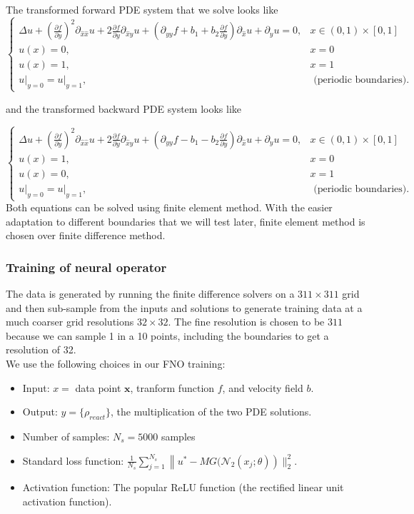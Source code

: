 \documentclass{article}
\begin{document}
The transformed forward PDE system that we solve looks like
$$
\begin{cases}\Delta u+\left(\frac{\partial f}{\partial y}\right)^2 \partial_{\hat{x} \hat{x}} u+2 \frac{\partial f}{\partial y} \partial_{\hat{x} y} u+\left(\partial_{y y} f+b_1+b_2 \frac{\partial f}{\partial y}\right) \partial_{\hat{x}} u+\partial_y u=0, & x \in(0,1) \times[0,1] \\ u(x)=0, & x=0 \\ u(x)=1, & x=1 \\ \left.u\right|_{y=0}=\left.u\right|_{y=1}, & \text { (periodic boundaries). }\end{cases}
$$

and the transformed backward PDE system looks like

$\begin{cases}\Delta u+\left(\frac{\partial f}{\partial y}\right)^2 \partial_{\hat{x} \hat{x}} u+2 \frac{\partial f}{\partial y} \partial_{\hat{x} y} u+\left(\partial_{y y} f-b_1-b_2 \frac{\partial f}{\partial y}\right) \partial_{\hat{x}} u+\partial_y u=0, & x \in(0,1) \times[0,1] \\ u(x)=1, & x=0 \\ u(x)=0, & x=1 \\ \left.u\right|_{y=0}=\left.u\right|_{y=1}, & \text { (periodic boundaries). }\end{cases}$ \\

Both equations can be solved using finite element method.  With the easier adaptation to different boundaries that we will test later, finite element method is chosen over finite difference method.

\subsubsection{Training of neural operator}

The data is generated by running the finite difference solvers on a $311\times311$ grid and
then sub-sample from the inputs and solutions to generate training data at a much coarser grid
resolutions $32\times32$. The fine resolution is chosen to be $311$ because we can sample 1 in a 10 points, including the boundaries to get a resolution of 32. \\

We use the following choices in our FNO training:
\begin{itemize}
\item Input: $x=$ data point $\boldsymbol{x}$, tranform function $f$, and velocity field $b$.
\item Output: $y=\{\rho_{react}\}$, the multiplication of the two PDE solutions.
\item Number of samples: $N_s=5000$ samples
\item Standard loss function: $\frac{1}{N_s} \sum_{j=1}^{N_s}\left\|u^*-MG(\mathcal{N}_2\left(x_{j} ; \theta\right)\right)\|_{2}^{2}$.
\item Activation function: The popular ReLU function (the rectified linear unit activation function).
\end{itemize}
\end{document}
